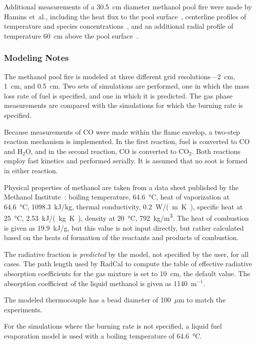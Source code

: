Additional measurements of a 30.5~cm diameter methanol pool fire were made by Hamins et~al., including the heat flux to the pool surface~\cite{Hamins:CST1994}, centerline profiles of temperature and species concentrations~\cite{Hamins:TN1928}, and an additional radial profile of temperature 60~cm above the pool surface~\cite{Hamins:TN1928}.

\subsubsection{Modeling Notes}

The methanol pool fire is modeled at three different grid resolutions---2~cm, 1~cm, and 0.5~cm. Two sets of simulations are performed, one in which the mass loss rate of fuel is specified, and one in which it is predicted. The gas phase measurements are compared with the simulations for which the burning rate is specified.

Because measurements of CO were made within the flame envelop, a two-step reaction mechanism is implemented. In the first reaction, fuel is converted to CO and H$_2$O, and in the second reaction, CO is converted to CO$_2$. Both reactions employ fast kinetics and performed serially. It is assumed that no soot is formed in either reaction.

Physical properties of methanol are taken from a data sheet published by the Methanol Institute~\cite{Methanol}: boiling temperature, 64.6~\unit{\degreeCelsius}, heat of vaporization at 64.6~\unit{\degreeCelsius}, 1098.3~kJ/kg, thermal conductivity, 0.2~\unit{W/(m.K)}, specific heat at 25~\unit{\degreeCelsius}, 2.53~\unit{kJ/(kg.K)}, density at 20~\unit{\degreeCelsius}, 792~\unit{kg/m^3}. The heat of combustion is given as 19.9~kJ/g, but this value is not input directly, but rather calculated based on the heats of formation of the reactants and products of combustion.

The radiative fraction is {\em predicted} by the model, not specified by the user, for all cases. The path length used by RadCal to compute the table of effective radiative absorption coefficients for the gas mixture is set to 10~cm, the default value. The absorption coefficient of the liquid methanol is given as 1140~m$^{-1}$.

The modeled thermocouple has a bead diameter of 100~$\mu$m to match the experiments.

For the simulations where the burning rate is not specified, a liquid fuel evaporation model is used with a boiling temperature of 64.6~\unit{\degreeCelsius}.


